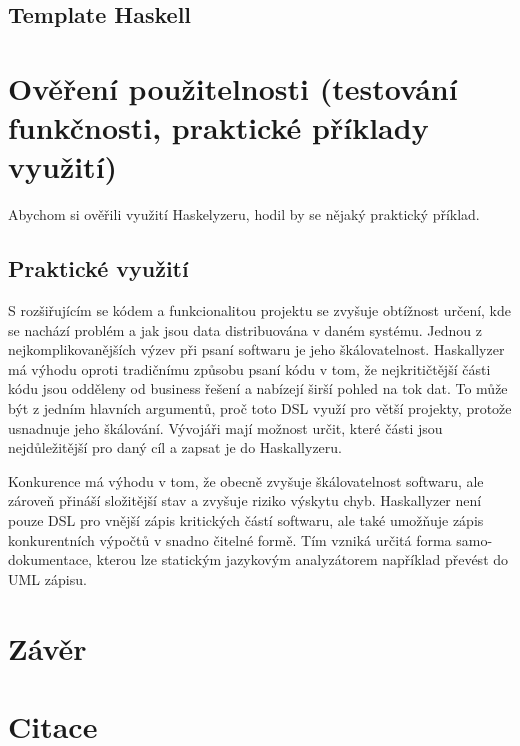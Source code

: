 \documentclass[male,czech]{kithesis}
\begin{document}
\section{Template Haskell}

\chapter{Ověření použitelnosti (testování funkčnosti, praktické příklady využití)}

Abychom si ověřili využití Haskelyzeru, hodil by se nějaký praktický příklad.



\section{Praktické využití}
S rozšiřujícím se kódem a funkcionalitou projektu se zvyšuje obtížnost určení, 
kde se nachází problém a jak jsou data distribuována v daném systému. 
Jednou z nejkomplikovanějších výzev při psaní softwaru je jeho škálovatelnost. 
Haskallyzer má výhodu oproti tradičnímu způsobu psaní kódu v tom, 
že nejkritičtější části kódu jsou odděleny od business řešení a nabízejí širší pohled na tok dat. 
To může být z jedním hlavních argumentů, proč toto DSL využí pro větší projekty,
protože usnadnuje jeho škálování.
Vývojáři mají možnost určit, které části jsou nejdůležitější pro daný cíl a zapsat je do Haskallyzeru.

Konkurence má výhodu v tom, že obecně zvyšuje škálovatelnost softwaru, 
ale zároveň přináší složitější stav a zvyšuje riziko výskytu chyb. 
Haskallyzer není pouze DSL pro vnější zápis kritických částí softwaru, 
ale také umožňuje zápis konkurentních výpočtů v snadno čitelné formě. 
Tím vzniká určitá forma samo-dokumentace, 
kterou lze statickým jazykovým analyzátorem například převést do UML zápisu.


\chapter{Závěr}

\chapter{Citace}


\cite{Katuscakc}
\cite{IntroToLLVM}
\printbibliography


\appendix
\end{document}
